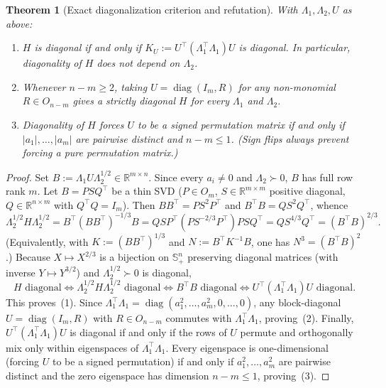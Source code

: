 \documentclass[11pt]{article}
\theoremstyle{plain}
\newtheorem{theorem}{Theorem}
\theoremstyle{definition}
\theoremstyle{remark}
\DeclareMathOperator{\diag}{diag}
\begin{document}
\begin{theorem}[Exact diagonalization criterion and refutation]\label{thm:c3}
With $\Lambda_1, \Lambda_2, U$ as above:
\begin{enumerate}[label=\textup{(\arabic*)}]
\item $H$ is diagonal if and only if $K_U := U^\top (\Lambda_1^\top \Lambda_1) U$ is diagonal. In particular, diagonality of $H$ does not depend on $\Lambda_2$.
\item Whenever $n - m \ge 2$, taking $U = \diag(I_m, R)$ for any non-monomial $R \in O_{n-m}$ gives a strictly diagonal $H$ for \emph{every} $\Lambda_1$ and $\Lambda_2$.
\item Diagonality of $H$ forces $U$ to be a signed permutation matrix if and only if $|a_1|, \dots, |a_m|$ are pairwise distinct and $n - m \le 1$. (Sign flips always prevent forcing a pure permutation matrix.)
\end{enumerate}
\end{theorem}

\begin{proof}
Set $B := \Lambda_1 U \Lambda_2^{1/2} \in \mathbb{R}^{m \times n}$. Since every $a_i \neq 0$ and $\Lambda_2 \succ 0$, $B$ has full row rank $m$. Let $B = P S Q^\top$ be a thin SVD ($P \in O_m$, $S \in \mathbb{R}^{m \times m}$ positive diagonal, $Q \in \mathbb{R}^{n \times m}$ with $Q^\top Q = I_m$). Then $BB^\top = PS^2P^\top$ and $B^\top B = QS^2Q^\top$, whence
\[
\Lambda_2^{1/2} H \Lambda_2^{1/2}
= B^\top (BB^\top)^{-1/3} B
= Q S P^\top (P S^{-2/3} P^\top) P S Q^\top
= Q S^{4/3} Q^\top
= (B^\top B)^{2/3}.
\]
(Equivalently, with $K := (BB^\top)^{1/3}$ and $N := B^\top K^{-1} B$, one has $N^3 = (B^\top B)^2$.)
Because $X \mapsto X^{2/3}$ is a bijection on $\mathbb{S}^n_+$ preserving diagonal matrices (with inverse $Y \mapsto Y^{3/2}$) and $\Lambda_2^{1/2} \succ 0$ is diagonal,
\[
H \text{ diagonal}
\iff \Lambda_2^{1/2} H \Lambda_2^{1/2} \text{ diagonal}
\iff B^\top B \text{ diagonal}
\iff U^\top (\Lambda_1^\top \Lambda_1) U \text{ diagonal}.
\]
This proves~(1). Since $\Lambda_1^\top \Lambda_1 = \diag(a_1^2, \dots, a_m^2, 0, \dots, 0)$, any block-diagonal $U = \diag(I_m, R)$ with $R \in O_{n-m}$ commutes with $\Lambda_1^\top \Lambda_1$, proving~(2). Finally, $U^\top (\Lambda_1^\top \Lambda_1) U$ is diagonal if and only if the rows of $U$ permute and orthogonally mix only within eigenspaces of $\Lambda_1^\top \Lambda_1$. Every eigenspace is one-dimensional (forcing $U$ to be a signed permutation) if and only if $a_1^2, \dots, a_m^2$ are pairwise distinct and the zero eigenspace has dimension $n - m \le 1$, proving~(3).
\end{proof}
\end{document}

